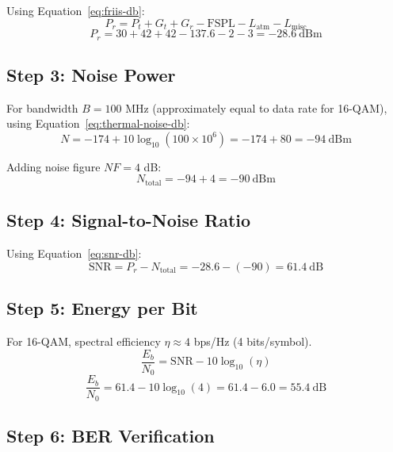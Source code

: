 Using Equation~\ref{eq:friis-db}:
\begin{equation}
P_r = P_t + G_t + G_r - \text{FSPL} - L_{\text{atm}} - L_{\text{misc}}
\end{equation}
\begin{equation}
P_r = 30 + 42 + 42 - 137.6 - 2 - 3 = -28.6\ \text{dBm}
\end{equation}

\subsection*{Step 3: Noise Power}

For bandwidth $B = 100$ MHz (approximately equal to data rate for 16-QAM), using Equation~\ref{eq:thermal-noise-db}:
\begin{equation}
N = -174 + 10\log_{10}(100 \times 10^6) = -174 + 80 = -94\ \text{dBm}
\end{equation}

Adding noise figure $NF = 4$ dB:
\begin{equation}
N_{\text{total}} = -94 + 4 = -90\ \text{dBm}
\end{equation}

\subsection*{Step 4: Signal-to-Noise Ratio}

Using Equation~\ref{eq:snr-db}:
\begin{equation}
\text{SNR} = P_r - N_{\text{total}} = -28.6 - (-90) = 61.4\ \text{dB}
\end{equation}

\subsection*{Step 5: Energy per Bit}

For 16-QAM, spectral efficiency $\eta \approx 4$ bps/Hz (4 bits/symbol).
\begin{equation}
\frac{E_b}{N_0} = \text{SNR} - 10\log_{10}(\eta)
\end{equation}
\begin{equation}
\frac{E_b}{N_0} = 61.4 - 10\log_{10}(4) = 61.4 - 6.0 = 55.4\ \text{dB}
\end{equation}

\subsection*{Step 6: BER Verification}

